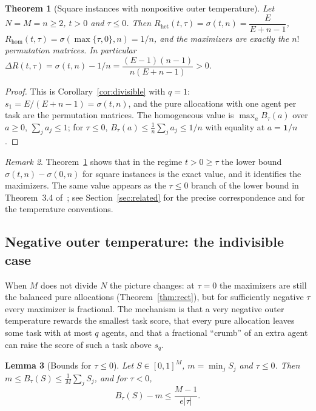 \documentclass[11pt]{article}
\theoremstyle{plain}
\newtheorem{theorem}{Theorem}[section]
\newtheorem{lemma}[theorem]{Lemma}
\theoremstyle{definition}
\theoremstyle{remark}
\newtheorem{remark}[theorem]{Remark}
\newcommand{\Rhet}{R_{\mathrm{het}}}
\newcommand{\Rhom}{R_{\mathrm{hom}}}
\newcommand{\sig}{\sigma}
\begin{document}
\begin{theorem}[Square instances with nonpositive outer temperature]\label{thm:square}
Let $N=M=n\ge2$, $t>0$ and $\tau\le0$. Then $\Rhet(t,\tau)=\sig(t,n)=\dfrac{E}{E+n-1}$, $\Rhom(t,\tau)=\sig(\max\{\tau,0\},n)=1/n$, and the maximizers are exactly the $n!$ permutation matrices. In particular $\Delta R(t,\tau)=\sig(t,n)-1/n=\dfrac{(E-1)(n-1)}{n(E+n-1)}>0$.
\end{theorem}

\begin{proof}
This is Corollary~\ref{cor:divisible} with $q=1$: $s_1=E/(E+n-1)=\sig(t,n)$, and the pure allocations with one agent per task are the permutation matrices. The homogeneous value is $\max_a B_\tau(a)$ over $a\ge0$, $\sum_ja_j\le1$; for $\tau\le0$, $B_\tau(a)\le\frac1n\sum_ja_j\le1/n$ with equality at $a=\mathbf 1/n$.
\end{proof}

\begin{remark}\label{rem:lowerbound}
Theorem~\ref{thm:square} shows that in the regime $t>0\ge\tau$ the lower bound $\sig(t,n)-\sig(0,n)$ for square instances is the exact value, and it identifies the maximizers. The same value appears as the $\tau\le0$ branch of the lower bound in Theorem~3.4 of~\cite{ABPv4}; see Section~\ref{sec:related} for the precise correspondence and for the temperature conventions.
\end{remark}

\subsection{Negative outer temperature: the indivisible case}\label{sec:negative}

When $M$ does not divide $N$ the picture changes: at $\tau=0$ the maximizers are still the balanced pure allocations (Theorem~\ref{thm:rect}), but for sufficiently negative $\tau$ every maximizer is fractional. The mechanism is that a very negative outer temperature rewards the smallest task score, that every pure allocation leaves some task with at most $q$ agents, and that a fractional ``crumb'' of an extra agent can raise the score of such a task above $s_q$.

\begin{lemma}[Bounds for $\tau\le0$]\label{lem:negouter}
Let $S\in[0,1]^M$, $m=\min_jS_j$ and $\tau\le0$. Then $m\le B_\tau(S)\le\frac1M\sum_jS_j$, and for $\tau<0$,
\begin{equation}\label{eq:negouter}
 B_\tau(S)-m\le\frac{M-1}{e|\tau|}.
\end{equation}
\end{lemma}
\end{document}
